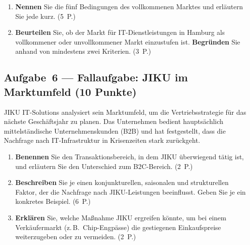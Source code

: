 \documentclass[11pt, a4paper]{article}
\begin{document}
\begin{enumerate}[label=(\alph*)]
  \item \textbf{Nennen} Sie die fünf Bedingungen des vollkommenen Marktes und erläutern
  Sie jede kurz. \hfill (5~P.)

  \vspace{7cm}

  \item \textbf{Beurteilen} Sie, ob der Markt für IT-Dienstleistungen in Hamburg als
  vollkommener oder unvollkommener Markt einzustufen ist. \textbf{Begründen} Sie anhand
  von mindestens zwei Kriterien. \hfill (3~P.)

  \vspace{5cm}
\end{enumerate}

\subsection*{Aufgabe~6 --- Fallaufgabe: JIKU im Marktumfeld (10 Punkte)}

JIKU IT-Solutions analysiert sein Marktumfeld, um die Vertriebsstrategie für das nächste
Geschäftsjahr zu planen. Das Unternehmen bedient hauptsächlich mittelständische
Unternehmenskunden (B2B) und hat festgestellt, dass die Nachfrage nach IT-Infrastruktur
in Krisenzeiten stark zurückgeht.

\begin{enumerate}[label=(\alph*)]
  \item \textbf{Benennen} Sie den Transaktionsbereich, in dem JIKU überwiegend tätig ist,
  und erläutern Sie den Unterschied zum B2C-Bereich. \hfill (2~P.)

  \vspace{4cm}

  \item \textbf{Beschreiben} Sie je einen konjunkturellen, saisonalen und strukturellen
  Faktor, der die Nachfrage nach JIKU-Leistungen beeinflusst. Geben Sie je ein konkretes
  Beispiel. \hfill (6~P.)

  \vspace{7cm}

  \item \textbf{Erklären} Sie, welche Maßnahme JIKU ergreifen könnte, um bei einem
  Verkäufermarkt (z.\,B.\ Chip-Engpässe) die gestiegenen Einkaufspreise weiterzugeben
  oder zu vermeiden. \hfill (2~P.)

  \vspace{4cm}
\end{enumerate}
\end{document}
